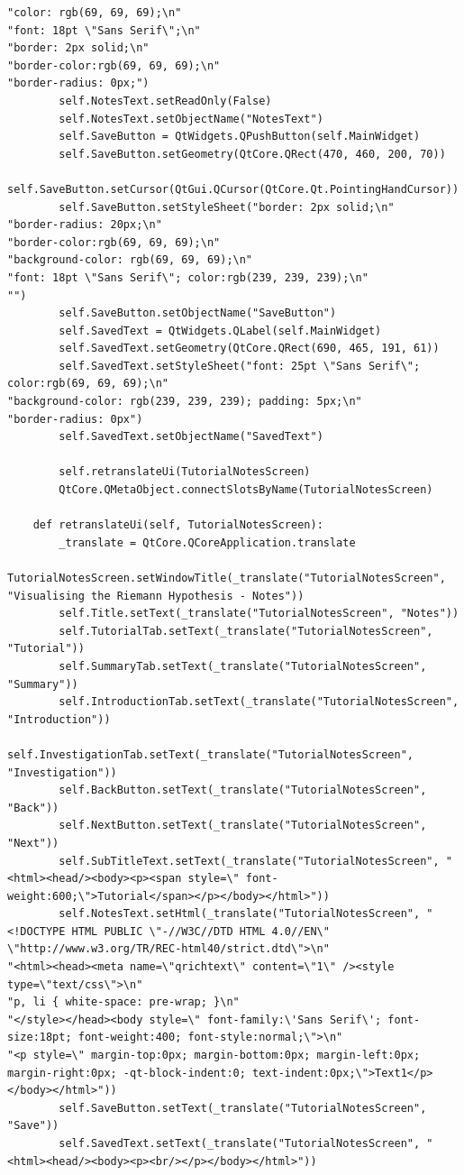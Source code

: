 \documentclass[12pt]{article}
\begin{document}
\begin{lstlisting}
"color: rgb(69, 69, 69);\n"
"font: 18pt \"Sans Serif\";\n"
"border: 2px solid;\n"
"border-color:rgb(69, 69, 69);\n"
"border-radius: 0px;")
        self.NotesText.setReadOnly(False)
        self.NotesText.setObjectName("NotesText")
        self.SaveButton = QtWidgets.QPushButton(self.MainWidget)
        self.SaveButton.setGeometry(QtCore.QRect(470, 460, 200, 70))
        self.SaveButton.setCursor(QtGui.QCursor(QtCore.Qt.PointingHandCursor))
        self.SaveButton.setStyleSheet("border: 2px solid;\n"
"border-radius: 20px;\n"
"border-color:rgb(69, 69, 69);\n"
"background-color: rgb(69, 69, 69);\n"
"font: 18pt \"Sans Serif\"; color:rgb(239, 239, 239);\n"
"")
        self.SaveButton.setObjectName("SaveButton")
        self.SavedText = QtWidgets.QLabel(self.MainWidget)
        self.SavedText.setGeometry(QtCore.QRect(690, 465, 191, 61))
        self.SavedText.setStyleSheet("font: 25pt \"Sans Serif\"; color:rgb(69, 69, 69);\n"
"background-color: rgb(239, 239, 239); padding: 5px;\n"
"border-radius: 0px")
        self.SavedText.setObjectName("SavedText")

        self.retranslateUi(TutorialNotesScreen)
        QtCore.QMetaObject.connectSlotsByName(TutorialNotesScreen)

    def retranslateUi(self, TutorialNotesScreen):
        _translate = QtCore.QCoreApplication.translate
        TutorialNotesScreen.setWindowTitle(_translate("TutorialNotesScreen", "Visualising the Riemann Hypothesis - Notes"))
        self.Title.setText(_translate("TutorialNotesScreen", "Notes"))
        self.TutorialTab.setText(_translate("TutorialNotesScreen", "Tutorial"))
        self.SummaryTab.setText(_translate("TutorialNotesScreen", "Summary"))
        self.IntroductionTab.setText(_translate("TutorialNotesScreen", "Introduction"))
        self.InvestigationTab.setText(_translate("TutorialNotesScreen", "Investigation"))
        self.BackButton.setText(_translate("TutorialNotesScreen", "Back"))
        self.NextButton.setText(_translate("TutorialNotesScreen", "Next"))
        self.SubTitleText.setText(_translate("TutorialNotesScreen", "<html><head/><body><p><span style=\" font-weight:600;\">Tutorial</span></p></body></html>"))
        self.NotesText.setHtml(_translate("TutorialNotesScreen", "<!DOCTYPE HTML PUBLIC \"-//W3C//DTD HTML 4.0//EN\" \"http://www.w3.org/TR/REC-html40/strict.dtd\">\n"
"<html><head><meta name=\"qrichtext\" content=\"1\" /><style type=\"text/css\">\n"
"p, li { white-space: pre-wrap; }\n"
"</style></head><body style=\" font-family:\'Sans Serif\'; font-size:18pt; font-weight:400; font-style:normal;\">\n"
"<p style=\" margin-top:0px; margin-bottom:0px; margin-left:0px; margin-right:0px; -qt-block-indent:0; text-indent:0px;\">Text1</p></body></html>"))
        self.SaveButton.setText(_translate("TutorialNotesScreen", "Save"))
        self.SavedText.setText(_translate("TutorialNotesScreen", "<html><head/><body><p><br/></p></body></html>"))
\end{lstlisting}
\end{document}
